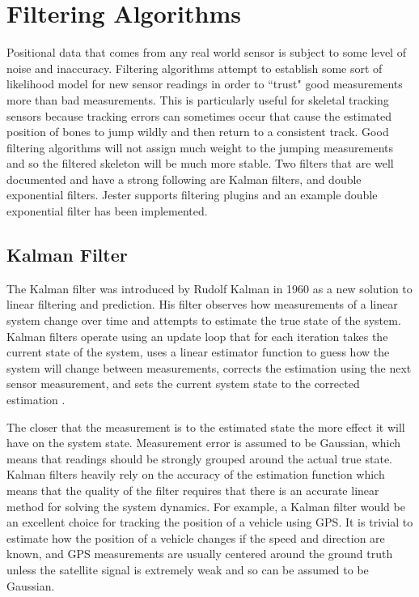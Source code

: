 \section{Filtering Algorithms}\label{sec:filter_back}

Positional data that comes from any real world sensor is subject to some level of noise and inaccuracy. Filtering algorithms attempt to establish some sort of likelihood model for new sensor readings in order to ``trust" good measurements more than bad measurements. This is particularly useful for skeletal tracking sensors because tracking errors can sometimes occur that cause the estimated position of bones to jump wildly and then return to a consistent track. Good filtering algorithms will not assign much weight to the jumping measurements and so the filtered skeleton will be much more stable. Two filters that are well documented and have a strong following are Kalman filters, and double exponential filters. Jester supports filtering plugins and an example double exponential filter has been implemented.

\subsection{Kalman Filter}

The Kalman filter was introduced by Rudolf Kalman in 1960 as a new solution to linear filtering and prediction. His filter observes how measurements of a linear system change over time and attempts to estimate the true state of the system. Kalman filters operate using an update loop that for each iteration takes the current state of the system, uses a linear estimator function to guess how the system will change between measurements, corrects the estimation using the next sensor measurement, and sets the current system state to the corrected estimation \cite{kalman1960new}. 

The closer that the measurement is to the estimated state the more effect it will have on the system state. Measurement error is assumed to be Gaussian, which means that readings should be strongly grouped around the actual true state. Kalman filters heavily rely on the accuracy of the estimation function which means that the quality of the filter requires that there is an accurate linear method for solving the system dynamics. For example, a Kalman filter would be an excellent choice for tracking the position of a vehicle using GPS. It is trivial to estimate how the position of a vehicle changes if the speed and direction are known, and GPS measurements are usually centered around the ground truth unless the satellite signal is extremely weak and so can be assumed to be Gaussian. 

